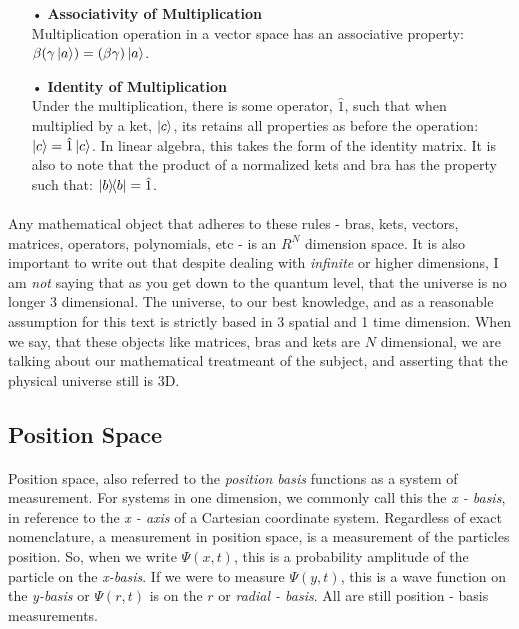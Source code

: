 \documentclass[12pt,letterpaper]{book}
\begin{document}
\begin{enumerate}
\item[•]\textbf{Associativity of Multiplication}\\
Multiplication operation in a vector space has an associative property: $\beta(\gamma\ket{a}) = (\beta\gamma)\ket{a}$.

\item[•]\textbf{Identity of Multiplication}\\
Under the multiplication, there is some operator, $\hat{1}$, such that when multiplied by a ket, $\ket{c}$, its retains all properties as before the operation: $\ket{c} = \hat{1}\ket{c}$. In linear algebra, this takes the form of the identity matrix. It is also to note that the  product of a normalized kets and bra has the property such that: $\ketbra{b}{b} = \hat{1}$.


\end{enumerate}

\paragraph*{}Any mathematical object that adheres to these rules - bras, kets, vectors, matrices, operators, polynomials, etc - is an $R^N$ dimension space. It is also important to write out that despite dealing with \textit{infinite} or higher dimensions, I am \textit{not} saying that as you get down to the quantum level, that the universe is no longer 3 dimensional. The universe, to our best knowledge, and as a reasonable assumption for this text is strictly based in 3 spatial and 1 time dimension. When we say, that these objects like matrices, bras and kets are $N$ dimensional, we are talking about our mathematical treatmeant of the subject, and asserting that the physical universe still is 3D.


\subsection*{Position Space}

\paragraph*{}Position space, also referred to the \textit{position basis} functions as a system of measurement. For systems in one dimension, we commonly call this the \textit{x - basis}, in reference to the \textit{x - axis} of a Cartesian coordinate system. Regardless of exact nomenclature, a measurement in position space, is a measurement of the particles position. So, when we write $\Psi(x,t)$, this is a probability amplitude of the particle on the \textit{x-basis}. If we were to measure $\Psi(y,t)$, this is a wave function on the \textit{y-basis} or $\Psi(r,t)$ is on the $r$ or \textit{radial - basis}. All are still position - basis measurements.
\end{document}
